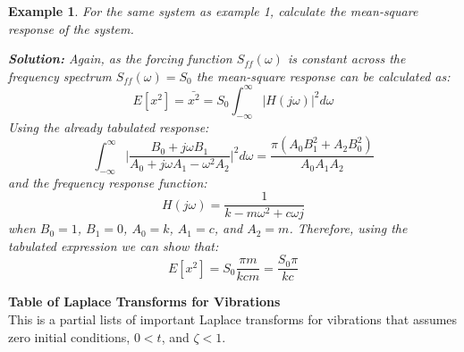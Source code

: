 \documentclass[12pt,letter]{article}
\newtheorem{ex}{Example}
\numberwithin{ex}{section} %
\newenvironment{example}{\begin{mdframed}[middlelinewidth=0.5mm]\begin{ex}\normalfont}{\end{ex}\end{mdframed}}
\numberwithin{re}{section} %
\begin{document}
\begin{example}



For the same system as example 1, calculate the mean-square response of the system. 

\noindent\textbf{Solution:} Again, as the forcing function $S_{ff}(\omega)$ is constant across the frequency spectrum $S_{ff}(\omega)=S_0$ the mean-square response can be calculated as:
\begin{equation}
E[x^2] = \bar{x^2} =   S_{0} \int_{-\infty}^{\infty} |H(j\omega)|^2 d\omega
\end{equation}
Using the already tabulated response:
\begin{equation}
\int_{-\infty}^{\infty} \bigg|\frac{B_0 + j \omega B_1}{A_0+j \omega A_1 - \omega^2 A_2} \bigg|^2 d\omega = \frac{\pi (A_0 B_1^2 + A_2 B_0^2)}{A_0 A_1 A_2}
\end{equation} 
and the frequency response function:
\begin{equation}
H(j\omega) = \frac{1}{k-m\omega^2+c\omega j}
\end{equation}
when $B_0=1$, $B_1 = 0$, $A_0=k$, $A_1=c$, and $A_2 =m$. Therefore, using the tabulated expression we can show that:
\begin{equation}
E[x^2] = S_0 \frac{\pi m }{k c m} =  \frac{S_0 \pi}{k c}
\end{equation} 

\end{example}			
			
\pagebreak			
			\pagestyle{empty}
			\vspace{-25ex}
			\begin{center}
			{\large{}\textbf{Table of Laplace Transforms for Vibrations}} \\
			\normalsize{} This is a partial lists of important Laplace transforms for vibrations that assumes \\ zero initial conditions, $0 < t$, and $\zeta < 1$.
			\end{center}
			
\end{document}
